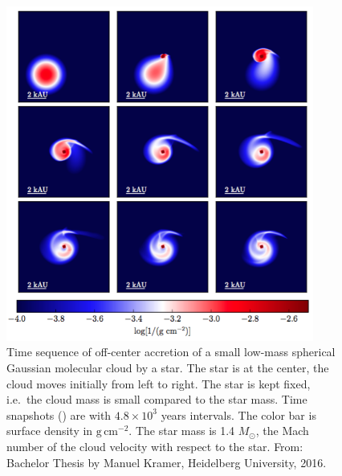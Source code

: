 \documentclass[10pt,fleqn,twoside,a4paper]{article}
\begin{document}
\begin{figure}
\centerline{\includegraphics[width=0.9\textwidth]{D2Fig/Kramer_Fig4-1-eps-converted-to.pdf}}
\caption{\label{fig-kramer-4.1}Time sequence of off-center accretion of a
  small low-mass spherical Gaussian molecular cloud by a star. The star is
  at the center, the cloud moves initially from left to right. The star is
  kept fixed, i.e.~the cloud mass is small compared to the star mass. Time
  snapshots () are with
  $4.8\times 10^3$ years intervals. The color bar is surface density in
  $\mathrm{g}\,\mathrm{cm}^{-2}$. The star mass is 1.4 $M_{\odot}$, the Mach
  number of the cloud velocity with respect to the star. From: Bachelor
  Thesis by Manuel Kramer, Heidelberg University, 2016.}
\end{figure}
\end{document}
